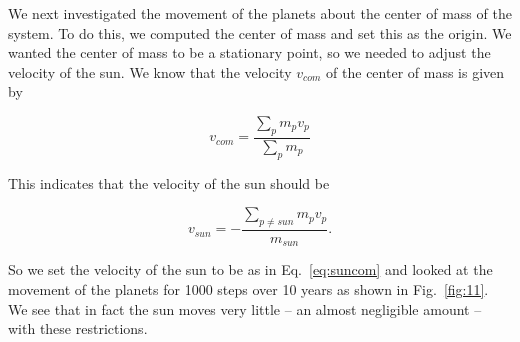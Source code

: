 \documentclass[12pt]{article}
\numberwithin{equation}{section}
\begin{document}
\par We next investigated the movement of the planets about the center of mass of the system.  To do this, we computed the center of mass and set this as the origin.  We wanted the center of mass to be a stationary point, so we needed to adjust the velocity of the sun.  We know that the velocity $v_{com}$ of the center of mass is given by 

$$
v_{com} = \frac{\sum_{p} m_{p}v_{p}}{\sum_{p} m_{p}}
$$

\noindent This indicates that the velocity of the sun should be

\begin{equation}
\label{eq:suncom}
v_{sun} = -\frac{\sum_{p\neq sun}m_{p}v_{p}}{m_{sun}}.
\end{equation}

\noindent So we set the velocity of the sun to be as in Eq.~\ref{eq:suncom} and looked at the movement of the planets for 1000 steps over 10 years as shown in Fig.~\ref{fig:11}.  We see that in fact the sun moves very little -- an almost negligible amount -- with these restrictions.
\end{document}
